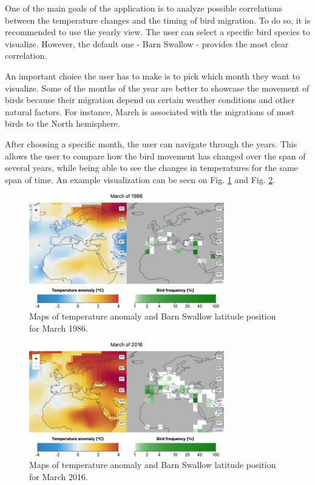 \documentclass[journal]{vgtc}                %
\begin{document}
One of the main goals of the application is to analyze possible correlations between the temperature changes and the timing of bird migration. To do so, it is recommended to use the yearly view. The user can select a specific bird species to visualize. However, the default one - Barn Swallow - provides the most clear correlation.

An important choice the user has to make is to pick which month they want to visualize. Some of the months of the year are better to showcase the movement of birds because their migration depend on certain weather conditions and other natural factors. For instance, March is associated with the migrations of most birds to the North hemisphere.

After choosing a specific month, the user can navigate through the years. This allows the user to compare how the bird movement has changed over the span of several years, while being able to see the changes in temperatures for the same span of time. An example visualization can be seen on Fig. \ref{fig:swallow-map-86} and Fig. \ref{fig:swallow-map-16}.

\begin{figure}[h]
  \centering
  \includegraphics[width=85mm]{march86-map-barnswallow}
  \caption{Maps of temperature anomaly and Barn Swallow latitude position for March 1986.}
  \label{fig:swallow-map-86}
\end{figure}

\begin{figure}[h]
  \centering
  \includegraphics[width=85mm]{march16-map-barnswallow}
  \caption{Maps of temperature anomaly and Barn Swallow latitude position for March 2016.}
  \label{fig:swallow-map-16}
\end{figure}
\end{document}
